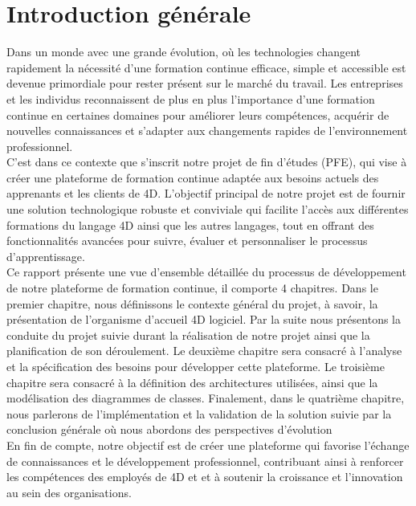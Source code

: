 \chapter*{Introduction générale}


Dans un monde avec une grande évolution, où les technologies changent rapidement la nécessité d'une formation continue efficace, simple et accessible est devenue primordiale pour rester présent sur le marché du travail. Les entreprises et les individus reconnaissent de plus en plus l’importance d'une formation continue en certaines domaines pour améliorer leurs compétences, acquérir de nouvelles connaissances et s'adapter aux changements rapides de l'environnement professionnel.\\

C'est dans ce contexte que s'inscrit notre projet de fin d'études (PFE), qui vise à créer une plateforme de formation continue adaptée aux besoins actuels des apprenants et les clients de 4D. L’objectif principal de notre projet est de fournir une solution technologique robuste et conviviale qui facilite l'accès aux différentes formations du langage 4D ainsi que les autres langages, tout en offrant des fonctionnalités avancées pour suivre, évaluer et personnaliser le processus d'apprentissage.\\

Ce rapport présente une vue d'ensemble détaillée du processus de développement de notre plateforme de formation continue, il comporte 4 chapitres. Dans le premier chapitre, nous définissons le contexte général du projet, à savoir, la présentation de l’organisme d’accueil 4D logiciel. Par la suite nous présentons la conduite du projet suivie durant la réalisation de notre projet ainsi que la planification de son déroulement. Le deuxième chapitre sera consacré à l’analyse et la spécification des besoins pour développer cette plateforme. Le troisième chapitre sera consacré à la définition des architectures utilisées, ainsi que la modélisation des diagrammes de classes. Finalement, dans le quatrième chapitre, nous parlerons de l’implémentation et la validation de la solution suivie par la conclusion générale où nous abordons des perspectives d’évolution\\

En fin de compte, notre objectif est de créer une plateforme qui favorise l'échange de connaissances et le développement professionnel, contribuant ainsi à renforcer les compétences des employés de 4D et  et à soutenir la croissance et l'innovation au sein des organisations.